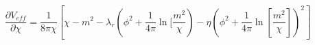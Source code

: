 \begin{equation}
\frac{\partial V_{eff}} {\partial \chi}= \frac{1} {8 \pi \chi} \left[\chi -
m^2 - \lambda_r \left(\phi^2
+\frac{1}{4
\pi} {\ln} [\frac{m^2}{\chi} \right) - \eta \left( \phi^2 +\frac{1}{4 \pi}
{\ln} [\frac{m^2}{\chi}] \right)^2  \right]
\end{equation}


